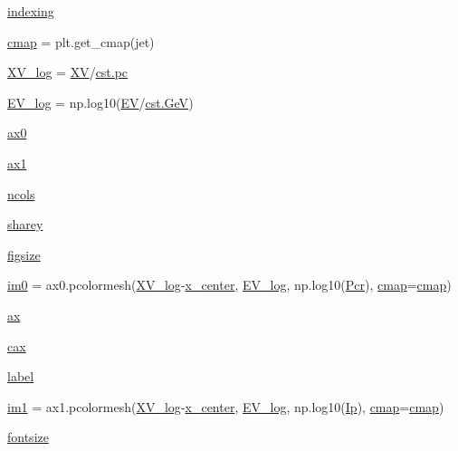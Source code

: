 \begin{DoxyCompactItemize}
\item 
\hyperlink{namespacepcr__ip__2D_adccbd43c0c9257002ea7f46bce162d3c}{indexing}
\item 
\hyperlink{namespacepcr__ip__2D_a2df3b02154af535c827d59c9a7a24b9e}{cmap} = plt.\+get\+\_\+cmap(\textquotesingle{}jet\textquotesingle{})
\item 
\hyperlink{namespacepcr__ip__2D_ac8c102166cd03830d33b1eac315a74f5}{X\+V\+\_\+log} = \hyperlink{namespacepcr__ip__2D_a31b44119623c5fa0707541a727fd6eeb}{XV}/\hyperlink{constants_8h_a2884cd030c4c825754349a525a1d06ce}{cst.\+pc}
\item 
\hyperlink{namespacepcr__ip__2D_af397aa7c591bd630fd12f918acd003ea}{E\+V\+\_\+log} = np.\+log10(\hyperlink{namespacepcr__ip__2D_a3ff07a36f29a76c8b68c1f1d2c27e93c}{EV}/\hyperlink{constants_8h_aec0e126d9991db8ad0b26139f5860568}{cst.\+GeV})
\item 
\hyperlink{namespacepcr__ip__2D_a634c6c8aa954bd20d35a65972360a875}{ax0}
\item 
\hyperlink{namespacepcr__ip__2D_a927f4dfdfc10474f6b7e9ecf356176f8}{ax1}
\item 
\hyperlink{namespacepcr__ip__2D_a5df90227ec98f758cb9ae27ca0264627}{ncols}
\item 
\hyperlink{namespacepcr__ip__2D_aefec735603895c749fff9141b2296549}{sharey}
\item 
\hyperlink{namespacepcr__ip__2D_a33274982731827ccd659ebf814eb95a1}{figsize}
\item 
\hyperlink{namespacepcr__ip__2D_a8e31912426f0e0182311460d868d1957}{im0} = ax0.\+pcolormesh(\hyperlink{namespacepcr__ip__2D_ac8c102166cd03830d33b1eac315a74f5}{X\+V\+\_\+log}-\/\hyperlink{namespacepcr__ip__2D_a5f81ee95156f4676e4e6bd159c2ec79e}{x\+\_\+center}, \hyperlink{namespacepcr__ip__2D_af397aa7c591bd630fd12f918acd003ea}{E\+V\+\_\+log}, np.\+log10(\hyperlink{namespacepcr__ip__2D_a0709cd4d093eccbf25a46d0b15d0dd86}{Pcr}), \hyperlink{namespacepcr__ip__2D_a2df3b02154af535c827d59c9a7a24b9e}{cmap}=\hyperlink{namespacepcr__ip__2D_a2df3b02154af535c827d59c9a7a24b9e}{cmap})
\item 
\hyperlink{namespacepcr__ip__2D_acc0c055bd5af52025f1cbe8b828dd1be}{ax}
\item 
\hyperlink{namespacepcr__ip__2D_aa8ff853d845234005c70383cc3f2f888}{cax}
\item 
\hyperlink{namespacepcr__ip__2D_ac88cc41145d6d402925a1977dd2b3649}{label}
\item 
\hyperlink{namespacepcr__ip__2D_aade1cb6ea3f020febc6029787ea8d723}{im1} = ax1.\+pcolormesh(\hyperlink{namespacepcr__ip__2D_ac8c102166cd03830d33b1eac315a74f5}{X\+V\+\_\+log}-\/\hyperlink{namespacepcr__ip__2D_a5f81ee95156f4676e4e6bd159c2ec79e}{x\+\_\+center}, \hyperlink{namespacepcr__ip__2D_af397aa7c591bd630fd12f918acd003ea}{E\+V\+\_\+log}, np.\+log10(\hyperlink{namespacepcr__ip__2D_a585cc4fbd898d4face7a2b37f0ad6636}{Ip}), \hyperlink{namespacepcr__ip__2D_a2df3b02154af535c827d59c9a7a24b9e}{cmap}=\hyperlink{namespacepcr__ip__2D_a2df3b02154af535c827d59c9a7a24b9e}{cmap})
\item 
\hyperlink{namespacepcr__ip__2D_a7ca40e67c77a7a84de5cb0ae76da4b0d}{fontsize}
\end{DoxyCompactItemize}


